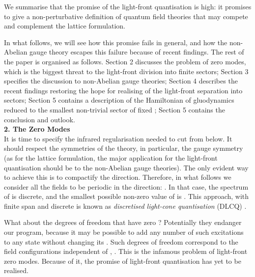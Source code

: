\documentclass[a4paper,12pt]{article}
\begin{document}
We summarise  that the promise of the light-front quantisation 
is high: it promises 
to give a non-perturbative 
definition of quantum field theories 
that may compete and complement the lattice formulation.

In what follows, we will see how this promise fails in general, and how the 
non-Abelian gauge theory escapes this failure 
because of recent findings.
The rest of the paper is organised as follows. 
Section 2 discusses the problem of zero modes, 
which is the biggest threat to the light-front division into finite sectors; 
Section 3 specifies the discussion to non-Abelian gauge theories; 
Section 4 describes the 
recent findings restoring the hope for
realising of the light-front separation into sectors; 
Section 5 contains a description of the Hamiltonian 
of \coordHE{} gluodynamics reduced to the smallest 
non-trivial sector of fixed \coordHE{}; 
Section 5 contains the conclusion and outlook.\\

{\bf  2. The Zero Modes }\\

It is time to specify the infrared regularisation needed 
to cut \coordHE{} from below. It 
should respect the symmetries of the theory, in particular, 
the gauge symmetry
(as for the lattice formulation, the major application for 
the light-front quantisation 
should be to the non-Abelian gauge theories). The only evident 
way to achieve this 
is to compactify the \coordHE{} direction. Therefore, in what follows we consider 
all the fields to be periodic in the \coordHE{} direction: 
\coordHE{}.
In that case, the spectrum of \coordHE{} is discrete, and the smallest 
possible non-zero value of \coordHE{} is \coordHE{}. This approach, 
with finite \coordHE{} span and discrete
\coordHE{} is known as {\it discretised light-cone quantisation} (DLCQ) 
\cite{Pauli,Maskawa}.

What about the degrees of freedom that have zero \coordHE{}? Potentially they 
endanger our program, because it may be possible to add any number of such 
excitations to any state without changing its \coordHE{}. Such degrees of freedom 
correspond to the field configurations independent of \coordHE{}, \coordHE{}. 
This is the infamous problem of light-front zero modes. Because of it, the promise 
of light-front quantisation has yet to be realised.
\end{document}
